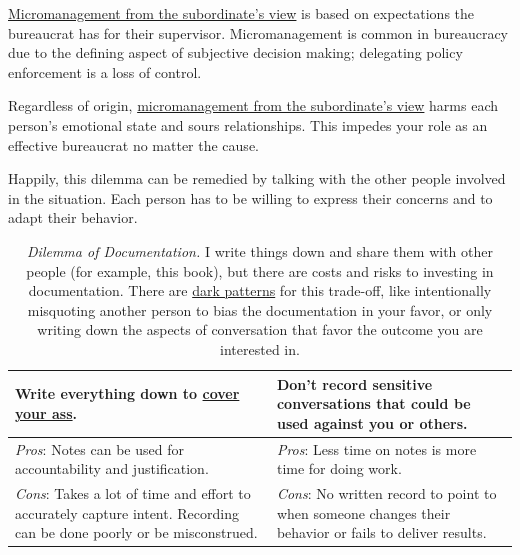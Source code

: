 \hyperref[table:dilemma-personal-solution-provider]{Micromanagement from the subordinate's view} is based on expectations the bureaucrat has for their supervisor. Micromanagement is common in bureaucracy due to the defining aspect of subjective decision making; delegating policy enforcement is a loss of control. 

Regardless of origin, \hyperref[table:dilemma-personal-solution-provider]{micromanagement from the subordinate's view} harms each person's emotional state and sours relationships. This impedes your role as an effective bureaucrat no matter the cause.

Happily, this dilemma can be remedied by talking with the other people involved in the situation. Each person has to be willing to express their concerns and to adapt their behavior. 

\begin{center}
\begin{table}[H] %
\begin{tabular}{ | m{\dilemmatablewidth}| m{\dilemmatablewidth} | } 
  \hline
  \textbf{Write everything down to \href{https://en.wikipedia.org/wiki/Cover_your_ass}{cover your ass}.
  \index{Wikipedia!\href{https://en.wikipedia.org/wiki/Cover_your_ass}{cover your ass}}
  } &
  \textbf{Don't record sensitive conversations that could be used against you or others.} \\
  \hline
  \textit{Pros}: Notes can be used for accountability and justification. &
  \textit{Pros}: Less time on notes is more time for doing work. \\
  \hline
  \textit{Cons}: Takes a lot of time and effort to accurately capture intent. Recording can be done poorly or be misconstrued.  & 
  \textit{Cons}: No written record to point to when someone changes their behavior or fails to deliver results. \\
  \hline
\end{tabular}
\caption{\textit{Dilemma of Documentation.}
I write things down and share them with other people (for example, this book), but there are costs and risks to investing in documentation. There are \href{https://en.wikipedia.org/wiki/Dark_pattern}{dark patterns}
for this trade-off, like intentionally misquoting another person to bias the documentation in your favor, or only writing down the aspects of conversation that favor the outcome you are interested in.  
}
\label{table:dilemma-personal-notes-or-no-notes}
\end{table}
\end{center}


